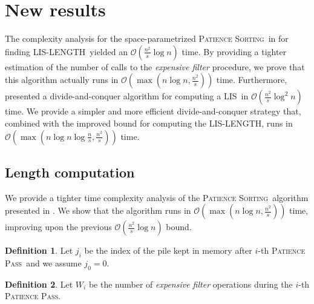 \documentclass[lic, english, shortabstract]{iithesis}
\theoremstyle{plain}
\newcommand{\Lis}{\textsc{LIS}}
\newcommand{\LisLen}{\textsc{LIS-LENGTH}}
\newcommand{\Psort}{\textsc{Patience Sorting}}
\newcommand{\Ppass}{\textsc{Patience Pass}}
\theoremstyle{definition}
\newtheorem{definition}{Definition}[section]
\begin{document}

\section{New results}

The complexity analysis for the space-parametrized \Psort\ in \cite{kiyomi2017space} for finding \LisLen\ yielded an $\mathcal{O}(\frac{n^2}{s} \log n)$ time.
By providing a tighter estimation of the number of calls to the \textit{expensive filter} procedure, we prove that this algorithm actually runs in $\mathcal{O}(\max(n \log n, \frac{n^2}{s}))$ time.
Furthermore, \cite{kiyomi2017space} presented a divide-and-conquer algorithm for computing a \Lis\ in $\mathcal{O}(\frac{n^2}{s} \log^2 n)$ time.
We provide a simpler and more efficient divide-and-conquer strategy that, combined with the improved bound for computing the \LisLen, runs in $\mathcal{O}(\max(n \log n \log \frac{n}{s}, \frac{n^2}{s}))$ time.


\subsection{Length computation}
We provide a tighter time complexity analysis of the \Psort\ algorithm presented in \cite{kiyomi2017space}. 
We show that the algorithm runs in $\mathcal{O}(\max(n \log n, \frac{n^2}{s}))$ time, improving upon the previous $\mathcal{O}(\frac{n^2}{s} \log n)$ bound.

\begin{definition}
    Let $j_i$ be the index of the pile kept in memory after $i$-th \Ppass\ and we assume $j_0=0$.
\end{definition}

\begin{definition}
Let $W_i$ be the number of \textit{expensive filter} operations during the $i$-th \Ppass.
\end{definition}
\end{document}
